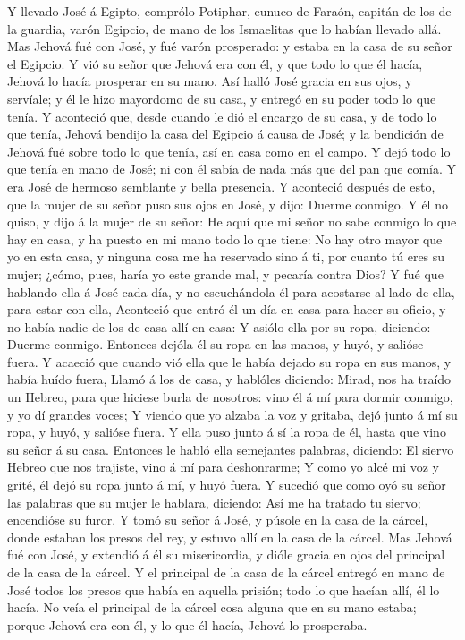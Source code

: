  Y llevado José á Egipto, comprólo Potiphar, eunuco de
Faraón, capitán de los de la guardia, varón Egipcio, de mano de los
Ismaelitas que lo habían llevado allá.  Mas Jehová fué con
José, y fué varón prosperado: y estaba en la casa de su señor el
Egipcio.  Y vió su señor que Jehová era con él, y que todo
lo que él hacía, Jehová lo hacía prosperar en su mano.  Así
halló José gracia en sus ojos, y servíale; y él le hizo mayordomo de su
casa, y entregó en su poder todo lo que tenía.  Y aconteció
que, desde cuando le dió el encargo de su casa, y de todo lo que tenía,
Jehová bendijo la casa del Egipcio á causa de José; y la bendición de
Jehová fué sobre todo lo que tenía, así en casa como en el campo.
 Y dejó todo lo que tenía en mano de José; ni con él sabía
de nada más que del pan que comía. Y era José de hermoso semblante y
bella presencia.  Y aconteció después de esto, que la mujer
de su señor puso sus ojos en José, y dijo: Duerme conmigo. 
Y él no quiso, y dijo á la mujer de su señor: He aquí que mi señor no
sabe conmigo lo que hay en casa, y ha puesto en mi mano todo lo que
tiene:  No hay otro mayor que yo en esta casa, y ninguna
cosa me ha reservado sino á ti, por cuanto tú eres su mujer; ¿cómo,
pues, haría yo este grande mal, y pecaría contra Dios?  Y
fué que hablando ella á José cada día, y no escuchándola él para
acostarse al lado de ella, para estar con ella,  Aconteció
que entró él un día en casa para hacer su oficio, y no había nadie de
los de casa allí en casa:  Y asiólo ella por su ropa,
diciendo: Duerme conmigo. Entonces dejóla él su ropa en las manos, y
huyó, y salióse fuera.  Y acaeció que cuando vió ella que
le había dejado su ropa en sus manos, y había huído fuera, 
Llamó á los de casa, y hablóles diciendo: Mirad, nos ha traído un
Hebreo, para que hiciese burla de nosotros: vino él á mí para dormir
conmigo, y yo dí grandes voces;  Y viendo que yo alzaba la
voz y gritaba, dejó junto á mí su ropa, y huyó, y salióse fuera.
 Y ella puso junto á sí la ropa de él, hasta que vino su
señor á su casa.  Entonces le habló ella semejantes
palabras, diciendo: El siervo Hebreo que nos trajiste, vino á mí para
deshonrarme;  Y como yo alcé mi voz y grité, él dejó su
ropa junto á mí, y huyó fuera.  Y sucedió que como oyó su
señor las palabras que su mujer le hablara, diciendo: Así me ha tratado
tu siervo; encendióse su furor.  Y tomó su señor á José, y
púsole en la casa de la cárcel, donde estaban los presos del rey, y
estuvo allí en la casa de la cárcel.  Mas Jehová fué con
José, y extendió á él su misericordia, y dióle gracia en ojos del
principal de la casa de la cárcel.  Y el principal de la
casa de la cárcel entregó en mano de José todos los presos que había en
aquella prisión; todo lo que hacían allí, él lo hacía.  No
veía el principal de la cárcel cosa alguna que en su mano estaba; porque
Jehová era con él, y lo que él hacía, Jehová lo prosperaba.

